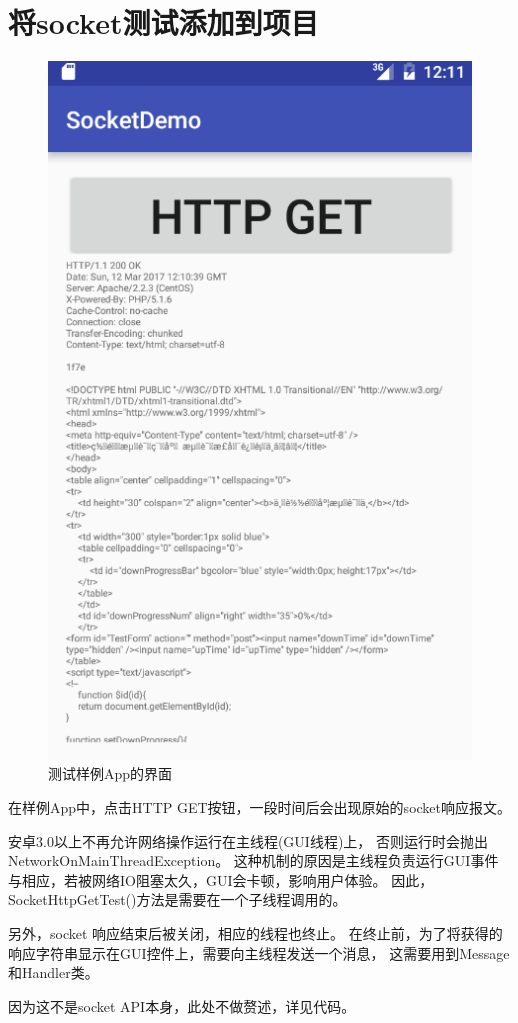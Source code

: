 \documentclass{article}
\begin{document}
\newpage

\section{将socket测试添加到项目}

\begin{figure}[ht]
\centering
\includegraphics[width=.46\textwidth]{App.png}
\caption{测试样例App的界面}
\end{figure}

在样例App中，点击HTTP GET按钮，一段时间后会出现原始的socket响应报文。

安卓3.0以上不再允许网络操作运行在主线程(GUI线程)上，
否则运行时会抛出NetworkOnMainThreadException。
这种机制的原因是主线程负责运行GUI事件与相应，若被网络IO阻塞太久，GUI会卡顿，影响用户体验。
因此，SocketHttpGetTest()方法是需要在一个子线程调用的。

另外，socket 响应结束后被关闭，相应的线程也终止。
在终止前，为了将获得的响应字符串显示在GUI控件上，需要向主线程发送一个消息，
这需要用到Message和Handler类。

因为这不是socket API本身，此处不做赘述，详见代码。
\end{document}

